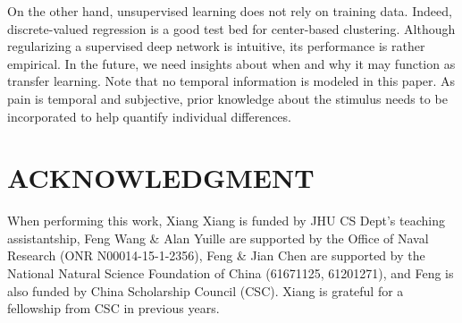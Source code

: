 \documentclass{article}
\begin{document}
On the other hand, unsupervised learning does not rely on training data.
Indeed, discrete-valued regression is a good test bed for center-based clustering.
Although regularizing a supervised deep network is intuitive, its performance is rather empirical. 
In the future, we need insights about when and why it may function as transfer learning.
Note that no temporal information is modeled in this paper.
As pain is temporal and subjective, prior knowledge about the stimulus needs to be incorporated to help quantify individual differences.

\vspace{-3mm}
\section{ACKNOWLEDGMENT}
\vspace{-3mm}
When performing this work, Xiang Xiang is funded by JHU CS Dept's teaching assistantship, Feng Wang \& Alan Yuille are supported by the Office of Naval Research (ONR N00014-15-1-2356), Feng \& Jian Chen are supported by the National Natural Science Foundation of China (61671125, 61201271), and Feng is also funded by China Scholarship Council (CSC). Xiang is grateful for a fellowship from CSC in previous years.


{


}
\end{document}
